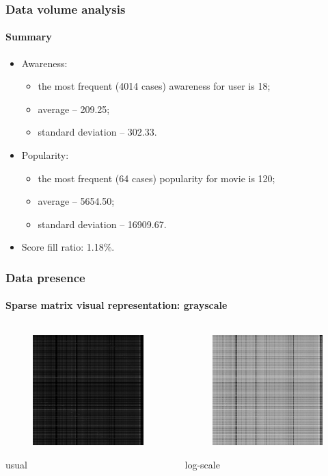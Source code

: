\documentclass{beamer}
\begin{document}
\begin{frame}
\frametitle{Data volume analysis}
\framesubtitle{Summary}
\begin{itemize}
  \item Awareness:
  	\begin{itemize}
    \item the most frequent (4014 cases) awareness for user is 18;
    \item average -- 209.25;
    \item standard deviation -- 302.33. 
    \end{itemize}
  \item Popularity:
  	\begin{itemize}
    \item the most frequent (64 cases) popularity for movie is 120;
    \item average -- 5654.50; 
    \item standard deviation -- 16909.67. 
    \end{itemize}
  \item Score fill ratio: 1.18\%.
\end{itemize}
\end{frame}

\begin{frame}
\frametitle{Data presence}
\framesubtitle{Sparse matrix visual representation: grayscale}
\begin{columns}[T] %
\begin{column}{.48\textwidth}
\begin{figure}[h] 
    \includegraphics[width=5cm]{usual_grayscale_0.png}
\end{figure}
usual
\end{column}%
\hfill%
\begin{column}{.48\textwidth}
\begin{figure}[h] 
    \includegraphics[width=5cm]{log_grayscale_0.png}
\end{figure}
log-scale
\end{column}%
\end{columns}
\end{frame}
\end{document}
